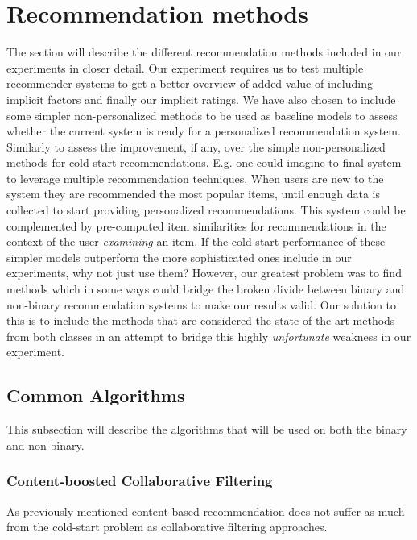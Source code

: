 
\section{Recommendation methods}

The section will describe the different recommendation methods included in our experiments in closer detail.
Our experiment requires us to test multiple recommender systems to get a better overview of added value of including implicit
factors and finally our implicit ratings. We have also chosen to include some simpler non-personalized
methods to be used as baseline models to assess whether the current system is ready for a personalized recommendation
system. Similarly to assess the improvement, if any, over the simple non-personalized methods for cold-start recommendations.
E.g. one could imagine to final system to leverage multiple recommendation techniques. When users are new to the system they
are recommended the most popular items, until enough data is collected to start providing personalized recommendations.
This system could be complemented by pre-computed item similarities for recommendations in the context of the user
\emph{examining} an item. If the cold-start performance of these simpler models outperform the more sophisticated ones
include in our experiments, why not just use them? However, our greatest problem was to find methods which in some ways
could bridge the broken divide between binary and non-binary recommendation systems to make our results valid. Our
solution to this is to include the methods that are considered the state-of-the-art methods from both classes in
an attempt to bridge this highly \emph{unfortunate} weakness in our experiment.

\subsection{Common Algorithms}

This subsection will describe the algorithms that will be used on both the binary and non-binary.

\subsubsection{Content-boosted Collaborative Filtering}

As previously mentioned content-based recommendation does not suffer as much from the cold-start problem as
collaborative filtering approaches. 

